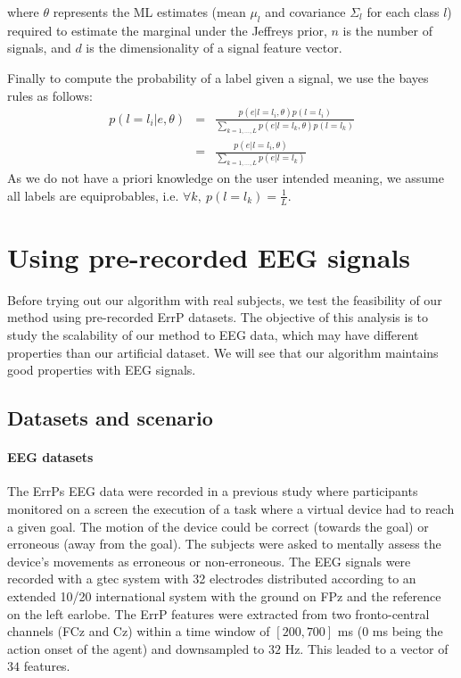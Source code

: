 where $\theta$ represents the ML estimates (mean $\mu_l$ and covariance $\Sigma_l$ for each class $l$) required to estimate the marginal under the Jeffreys prior, $n$ is the number of signals, and $d$ is the dimensionality of a signal feature vector.

Finally to compute the probability of a label given a signal, we use the bayes rules as follows:
%
\begin{eqnarray}
    p(l = l_i|e,\theta) &=& \frac{p(e|l = l_i, \theta)p(l = l_i)}{\sum_{k = 1,\ldots, L}{p(e|l = l_k,\theta)p(l = l_k)}}\nonumber \\
    &=& \frac{p(e|l=l_i, \theta)}{\sum_{k = 1,\ldots, L} p(e|l=l_k)} \nonumber
\end{eqnarray}
%
As we do not have a priori knowledge on the user intended meaning, we assume all labels are equiprobables, i.e. $\forall k,~p(l = l_k) = \frac{1}{L}$.

\section{Using pre-recorded EEG signals}
\label{chapter:bci:EEGsignals}

Before trying out our algorithm with real subjects, we test the feasibility of our method using pre-recorded ErrP datasets. The objective of this analysis is to study the scalability of our method to EEG data, which may have different properties than our artificial dataset. We will see that our algorithm maintains good properties with EEG signals.

\subsection{Datasets and scenario}

\paragraph{EEG datasets}  The ErrPs EEG data were recorded in a previous study \cite{iturrate2013task} where participants monitored on a screen the execution of a task where a virtual device had to reach a given goal. The motion of the device could be correct (towards the goal) or erroneous (away from the goal). The subjects were asked to mentally assess the device's movements as erroneous or non-erroneous. The EEG signals were recorded with a gtec system with 32 electrodes distributed according to an extended 10/20 international system with the ground on FPz and the reference on the left earlobe. The ErrP features were extracted from two fronto-central channels (FCz and Cz) within a time window of $[200,700]$ ms (0 ms being the action onset of the agent) and downsampled to $32$ Hz. This leaded to a vector of $34$ features.

